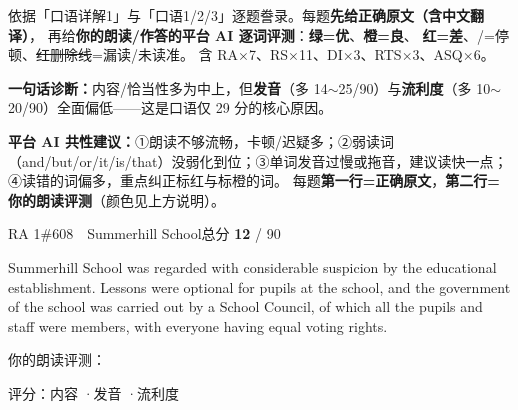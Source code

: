 
\vspace{1mm}
{\small\color{gray} 依据「口语详解1」与「口语1/2/3」逐题誊录。每题\textbf{先给正确原文（含中文翻译）}，
再给\textbf{你的朗读/作答的平台 AI 逐词评测}：{\color{cSpkGood}\textbf{绿=优}}、{\color{cSpkOk}\textbf{橙=良}}、
{\color{cSpkBad}\textbf{红=差}}、{\color{gray}/=停顿}、{\color{cSpkBad}\sout{红删除线}}=漏读/未读准。
含 RA$\times$7、RS$\times$11、DI$\times$3、RTS$\times$3、ASQ$\times$6。}
\vspace{1mm}

\begin{notebox}
{\footnotesize \textbf{一句话诊断：}内容/恰当性多为中上，但\textbf{发音}（多 14$\sim$25/90）与\textbf{流利度}（多 10$\sim$20/90）全面偏低——这是口语仅 29 分的核心原因。}
\end{notebox}


\begin{notebox}
{\footnotesize\textbf{平台 AI 共性建议：}①朗读不够流畅，卡顿/迟疑多；②弱读词（and/but/or/it/is/that）没弱化到位；③单词发音过慢或拖音，建议读快一点；④读错的词偏多，重点纠正{\color{cSpkBad}标红}与{\color{cSpkOk}标橙}的词。
\quad 每题\textbf{第一行=正确原文}，\textbf{第二行=你的朗读评测}（颜色见上方说明）。}
\end{notebox}

\begin{qblock}{RA 1\quad \#608\ \ Summerhill School}{总分 \textcolor{cAccent}{\bfseries 12} / 90}
\begin{promptbox}
Summerhill School was regarded with considerable suspicion by the educational establishment. Lessons were optional for pupils at the school, and the government of the school was carried out by a School Council, of which all the pupils and staff were members, with everyone having equal voting rights.
\end{promptbox}
\smallskip\par{\footnotesize\color{gray}你的朗读评测：}
\begin{asrbox}
  \pse {}   \pse {}  \pse {}  \pse {} \pse {} \pse {}  \pse {} \pse {}
\end{asrbox}
{\small 评分：内容 \quad·\quad 发音 \quad·\quad 流利度 }
\end{qblock}

